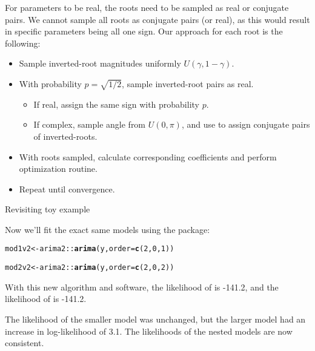 \documentclass[aspectratio=169]{beamer}\usepackage[]{graphicx}\usepackage[]{xcolor}
\makeatletter
\newcommand{\hlnum}[1]{\textcolor[rgb]{0.686,0.059,0.569}{#1}}%
\newcommand{\hlopt}[1]{\textcolor[rgb]{0,0,0}{#1}}%
\newcommand{\hldef}[1]{\textcolor[rgb]{0.345,0.345,0.345}{#1}}%
\newcommand{\hlkwb}[1]{\textcolor[rgb]{0.69,0.353,0.396}{#1}}%
\newcommand{\hlkwc}[1]{\textcolor[rgb]{0.333,0.667,0.333}{#1}}%
\newcommand{\hlkwd}[1]{\textcolor[rgb]{0.737,0.353,0.396}{\textbf{#1}}}%
\newenvironment{kframe}{%
 \def\at@end@of@kframe{}%
 \ifinner\ifhmode%
  \def\at@end@of@kframe{\end{minipage}}%
  \begin{minipage}{\columnwidth}%
 \fi\fi%
 \def\FrameCommand##1{\hskip\@totalleftmargin \hskip-\fboxsep
 \colorbox{shadecolor}{##1}\hskip-\fboxsep
     \hskip-\linewidth \hskip-\@totalleftmargin \hskip\columnwidth}%
 \MakeFramed {\advance\hsize-\width
   \@totalleftmargin\z@ \linewidth\hsize
   \@setminipage}}%
 {\par\unskip\endMakeFramed%
 \at@end@of@kframe}
\newenvironment{knitrout}{}{} %
\makeatother
\begin{document}
\begin{frame}
  For parameters to be real, the roots need to be sampled as real or conjugate pairs. We cannot sample all roots as conjugate pairs (or real), as this would result in specific parameters being all one sign. Our approach for each root is the following:
  \begin{itemize}
    \item Sample inverted-root magnitudes uniformly $U(\gamma, 1-\gamma)$.
    \item With probability $p = \sqrt{1/2}$, sample inverted-root pairs as real.
    \begin{itemize}
      \item If real, assign the same sign with probability $p$.
      \item If complex, sample angle from $U(0, \pi)$, and use to assign conjugate pairs of inverted-roots.
    \end{itemize}
    \item With roots sampled, calculate corresponding coefficients and perform optimization routine.
    \item Repeat until convergence.
  \end{itemize}
\end{frame}

\begin{frame}{Revisiting toy example}

Now we'll fit the exact same models using the  package:



\begin{knitrout}
\color{fgcolor}\begin{kframe}
\begin{alltt}
\hldef{mod1v2} \hlkwb{<-} \hldef{arima2}\hlopt{::}\hlkwd{arima}\hldef{(y,} \hlkwc{order} \hldef{=} \hlkwd{c}\hldef{(}\hlnum{2}\hldef{,} \hlnum{0}\hldef{,} \hlnum{1}\hldef{))}

\hldef{mod2v2} \hlkwb{<-} \hldef{arima2}\hlopt{::}\hlkwd{arima}\hldef{(y,} \hlkwc{order} \hldef{=} \hlkwd{c}\hldef{(}\hlnum{2}\hldef{,} \hlnum{0}\hldef{,} \hlnum{2}\hldef{))}
\end{alltt}
\end{kframe}
\end{knitrout}

With this new algorithm and software, the likelihood of  is -141.2, and the likelihood of  is -141.2.

\pause
The likelihood of the smaller model was unchanged, but the larger model had an increase in log-likelihood of 3.1. The likelihoods of the nested models are now \alert{consistent}.
\end{frame}
\end{document}
